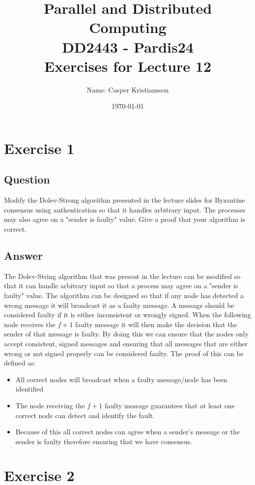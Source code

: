 \documentclass{article}
\title{\textbf{Parallel and Distributed Computing\\DD2443 - Pardis24\\Exercises for Lecture 12}}
\author{Name: Casper Kristiansson}
\date{\today}
\begin{document}
\setlength\parindent{0pt}
\setlength{\parskip}{\bigskipamount}

\maketitle

\section*{Exercise 1}
\subsection*{Question}
Modify the Dolev-Strong algorithm presented in the lecture slides for Byzantine consensus using authentication so that it handles arbitrary input. The processes may also agree on a "sender is faulty" value. Give a proof that your algorithm is correct.

\subsection*{Answer}
The Dolev-String algorithm that was present in the lecture can be modified so that it can handle arbitrary input so that a process may agree on a "sender is faulty" value. The algorithm can be designed so that if any node has detected a wrong message it will broadcast it as a faulty message. A message should be considered faulty if it is either inconsistent or wrongly signed. When the following node receives the \(f + 1\) faulty message it will then make the decision that the sender of that message is faulty. By doing this we can ensure that the nodes only accept consistent, signed messages and ensuring that all messages that are either wrong or not signed properly can be considered faulty. The proof of this can be defined as:

\begin{itemize}
    \item All correct nodes will broadcast when a faulty message/node has been identified
    \item The node receiving the \(f + 1\) faulty message guarantees that at least one correct node can detect and identify the fault.
    \item Because of this all correct nodes can agree when a sender's message or the sender is faulty therefore ensuring that we have consensus.
\end{itemize}


\section*{Exercise 2}
\end{document}
